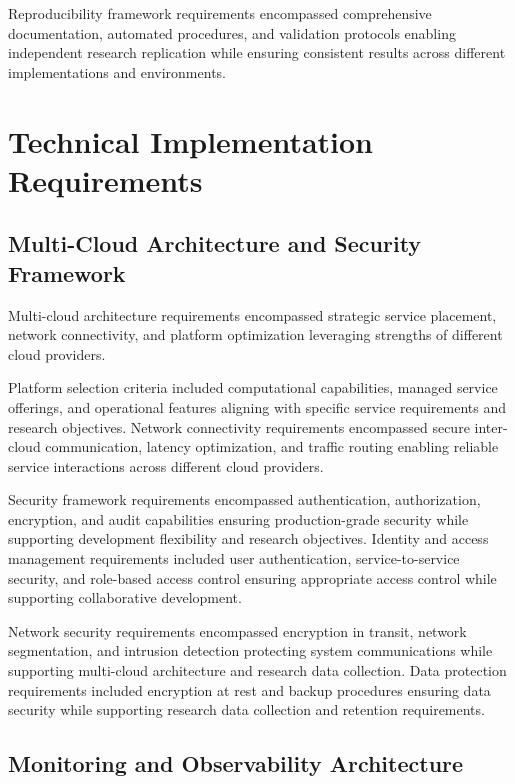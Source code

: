 Reproducibility framework requirements encompassed comprehensive documentation, automated procedures, and validation protocols enabling independent research replication while ensuring consistent results across different implementations and environments.

\section{Technical Implementation Requirements}

\subsection{Multi-Cloud Architecture and Security Framework}

Multi-cloud architecture requirements \cite{multicloud_patterns2023} encompassed strategic service placement, network connectivity, and platform optimization leveraging strengths of different cloud providers.

Platform selection criteria included computational capabilities, managed service offerings, and operational features aligning with specific service requirements and research objectives. Network connectivity requirements encompassed secure inter-cloud communication, latency optimization, and traffic routing enabling reliable service interactions across different cloud providers.


Security framework requirements encompassed authentication, authorization, encryption, and audit capabilities ensuring production-grade security while supporting development flexibility and research objectives. Identity and access management requirements included user authentication, service-to-service security, and role-based access control ensuring appropriate access control while supporting collaborative development.

Network security requirements encompassed encryption in transit, network segmentation, and intrusion detection protecting system communications while supporting multi-cloud architecture and research data collection. Data protection requirements included encryption at rest and backup procedures ensuring data security while supporting research data collection and retention requirements.

\subsection{Monitoring and Observability Architecture}

